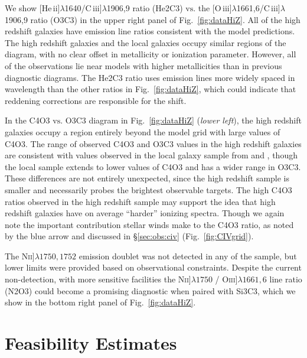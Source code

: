 \documentclass[preprint2,trackchanges]{aastex62}
\newcommand{\oiii}{[O\,{\sc iii}]\xspace}
\newcommand{\heii}{[He\,{\sc ii}]\xspace}
\newcommand{\ciii}{C\,{\sc iii}]\xspace}
\newcommand\vs{\ensuremath{\mathrm{vs.}}\xspace}
\begin{document}
We show \heii$\lambda$1640/\ciii$\lambda$1906,9 ratio (He2C3) \vs the \oiii$\lambda$1661,6/\ciii$\lambda$1906,9 ratio (O3C3) in the upper right panel of Fig.~\ref{fig:dataHiZ}. All of the high redshift galaxies have emission line ratios consistent with the model predictions. The high redshift galaxies and the local galaxies occupy similar regions of the diagram, with no clear offset in metallicity or ionization parameter. However, all of the observations lie near models with higher metallicities than in previous diagnostic diagrams. The He2C3 ratio uses emission lines more widely spaced in wavelength than the other ratios in Fig.~\ref{fig:dataHiZ}, which could indicate that reddening corrections are responsible for the shift.

In the C4O3 \vs O3C3 diagram in Fig.~\ref{fig:dataHiZ} (\emph{lower left}), the high redshift galaxies occupy a region entirely beyond the model grid with large values of C4O3. The range of observed C4O3 and O3C3 values in the high redshift galaxies are consistent with values observed in the local galaxy sample from \citet{Berg+2016} and \citet{Senchyna+2017}, though the local sample extends to lower values of C4O3 and has a wider range in O3C3. These differences are not entirely unexpected, since the high redshift sample is smaller and necessarily probes the brightest observable targets. The high C4O3 ratios observed in the high redshift sample may support the idea that high redshift galaxies have on average ``harder'' ionizing spectra. Though we again note the important contribution stellar winds make to the C4O3 ratio, as noted by the blue arrow and discussed in \S\ref{sec:obs:civ} (Fig.~\ref{fig:CIVgrid}).

The N\textsc{ii}]$\lambda1750,1752$ emission doublet was not detected in any of the \citet{Stark+2014} sample, but lower limits were provided based on observational constraints. Despite the current non-detection, with more sensitive facilities the N\textsc{ii}]$\lambda1750$ / O\textsc{iii}]$\lambda1661,6$ line ratio (N2O3) could become a promising diagnostic when paired with Si3C3, which we show in the bottom right panel of Fig.~\ref{fig:dataHiZ}.


\section{Feasibility Estimates} \label{sec:feas}
\end{document}
